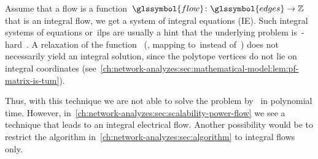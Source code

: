 Assume that a flow is a function~$
    \glssymbol{flow}
    \colon
    \glssymbol{edges}
    \to
    \integers
$ that is an integral flow, we get a system of integral equations (IE). Such
integral systems of equations or~\gls{ilp}s are usually a hint that the
underlying problem is~\NP-hard~\parencite[p.245; MP1]{Gar79}. A relaxation of
the function~ (\ie, mapping to~\reals instead of~\integers) does
not necessarily yield an integral solution, since the polytope vertices do not
lie on integral coordinates 
(see~\cref{ch:network-analyzes:sec:mathematical-model:lem:pf-matrix-is-tum}).

Thus, with this technique we are not able to solve the problem
by~\textcite[pp.17ff.; Theorem~4.1]{Fel13} in polynomial time. However,
in~\cref{ch:network-analyzes:sec:scalability-power-flow} we see a technique that
leads to an integral electrical flow. Another possibility would be to restrict
the algorithm in~\cref{ch:network-analyzes:sec:algorithm} to integral flows
only.
% 
